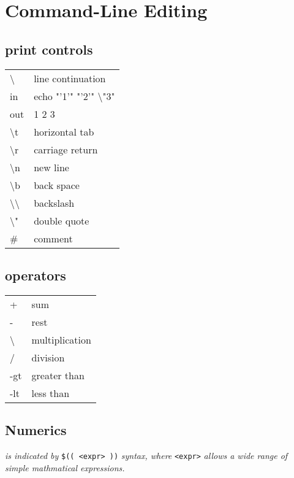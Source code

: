 \section{Command-Line Editing}



\subsection*{print controls}

\begin{tabular}{l   l}
	\textbackslash & line continuation \\
 	in & echo "'1'" "'2'"  \textbackslash \Return "3" \\
    	out &  1 2 3\\
    	\textbackslash t & horizontal tab\\
	\textbackslash r & carriage return\\
	\textbackslash n& new line\\
	\textbackslash b & back space\\
	\textbackslash \textbackslash & backslash\\
	\textbackslash " & double quote\\
	\#  &	comment \\
\end{tabular}

\subsection*{operators}

\begin{tabular}{l   l}
    + & sum\\
    - & rest\\
	\textbackslash\text{*}  & multiplication\\
	/ & division\\
    -gt &   greater than\\
    -lt &   less than\\
\end{tabular}

\subsection*{Numerics}
\textit{ is indicated by }\texttt{\$(( <expr> ))}\textit{ syntax, where }\texttt{<expr>}\textit{ allows a wide range of simple mathmatical expressions.}\\
\\
\\
\\
\\

